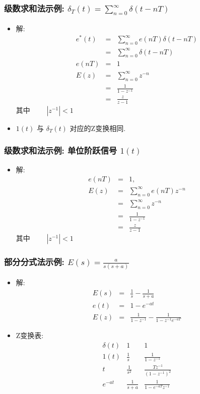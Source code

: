 \documentclass[table]{beamer}
\begin{document}
\begin{frame}
\frametitle{级数求和法示例: $\delta_T(t)=\sum_{n=0}^{\infty}\delta(t-nT)$}
\label{sec-1-3}

\begin{itemize}
\item <2->解:
     \begin{eqnarray*}
     e^*(t) & = & \sum_{n=0}^{\infty}e(nT)\delta(t-nT) \\
      &=& \sum_{n=0}^{\infty}\delta(t-nT) \\
     e(nT) &=& 1\\
     E(z) &=& \sum_{n=0}^{\infty}z^{-n}\\
      &=& \frac{1}{1-z^{-1}} \\
     &=& \frac{z}{z-1}
     \end{eqnarray*}
     其中 $\qquad |z^{-1}|<1$
\item <3->$1(t)$  与  $\delta_T(t)$  对应的Z变换相同.
\end{itemize}
\end{frame}
\begin{frame}
\frametitle{级数求和法示例: 单位阶跃信号 $1(t)$}
\label{sec-1-4}

\begin{itemize}
\item <2-> 解: 
      \begin{eqnarray*}
      e(nT)&=&1 , \\
      E(z) &=  &\sum_{n=0}^{\infty}e(nT)z^{-n} \\
       &=& \sum_{n=0}^{\infty}z^{-n} \\
      &=& \frac{1}{1-z^{-1}} \\
      &=& \frac{z}{z-1}
      \end{eqnarray*}
      其中  $\qquad |z^{-1}|<1$
\end{itemize}
\end{frame}
\begin{frame}
\frametitle{部分分式法示例:  $E(s)=\frac{a}{s(s+a)}$}
\label{sec-1-5}

\begin{itemize}
\item <2->解:
     \begin{eqnarray*}
     E(s) & = & \frac{1}{s}-\frac{1}{s+a}\\
     e(t) &=& 1-e^{-at} \\
     E(z) &=& \frac{1}{1-z^{-1}} -\frac{1}{1-z^{-1}e^{-aT}}
     \end{eqnarray*}
\item <3->Z变换表:
     \[\begin{matrix}
     \delta(t) & 1 & 1 \\
     1(t) & \frac{1}{s} & \frac{1}{1-z^{-1}} \\
     t & \frac{1}{s^2} & \frac{Tz^{-1}}{(1-z^{-1})^2} \\
     e^{-at} & \frac{1}{s+a} &\frac{1}{1-e^{-aT}z^{-1}}
     \end{matrix}\]
\end{itemize}
\end{frame}
\end{document}
